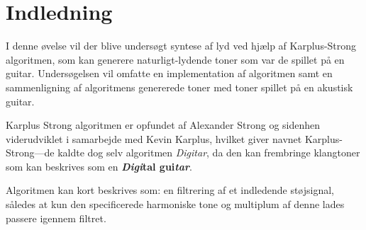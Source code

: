 \section{Indledning}

I denne øvelse vil der blive undersøgt syntese af lyd ved hjælp af Karplus-Strong algoritmen, som kan generere naturligt-lydende toner som var de spillet på en guitar.
Undersøgelsen vil omfatte en implementation af algoritmen samt en sammenligning af algoritmens genererede toner med toner spillet på en akustisk guitar.

Karplus Strong algoritmen er opfundet af Alexander Strong og sidenhen viderudviklet i samarbejde med Kevin Karplus\cite{Karplus1983}, hvilket giver navnet Karplus-Strong---de kaldte dog selv algoritmen \emph{Digitar}, da den kan frembringe klangtoner som kan beskrives som en \textbf{\emph{Digi}tal gui\emph{tar}}.

Algoritmen kan kort beskrives som: en filtrering af et indledende støjsignal, således at kun den specificerede harmoniske tone og multiplum af denne lades passere igennem filtret.
